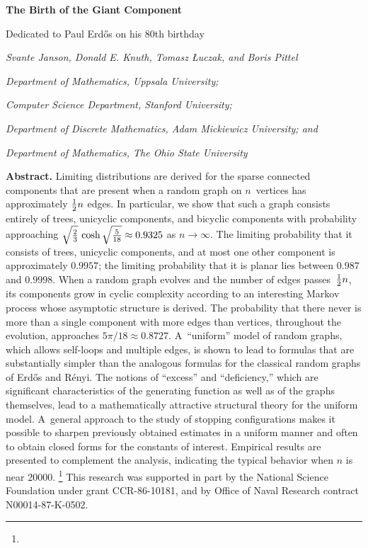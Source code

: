 \centerline{\bf The Birth of the Giant Component}
\bigskip
\centerline{Dedicated to Paul Erd\H{o}s on his 80th birthday}
\bigskip
\centerline{\sl Svante Janson, Donald E. Knuth, Tomasz \L uczak,
 and Boris Pittel}
\smallskip
\centerline{\sl Department of  Mathematics, Uppsala University;}
\centerline{\sl  Computer Science Department, Stanford University;}
\centerline{\sl Department of Discrete Mathematics, Adam Mickiewicz
University; and}
\centerline{\sl Department of Mathematics, The Ohio State University}
\bigskip
{\narrower\smallskip\noindent
{\bf Abstract.}\enspace
Limiting distributions are derived for the sparse connected components that are
present when a random graph on $n$~vertices has approximately ${1\over2}  n$
edges. In particular, we show that such a graph consists entirely of trees,
unicyclic components, and bicyclic components with probability approaching
$\sqrt{2\over 3}\,\cosh\sqrt{5\over 18}\approx0.9325$
 as $n\to\infty$. The limiting probability that it consists of trees, unicyclic
components, and at most one other component is approximately
$0.9957$; the limiting probability that it is planar lies between
$0.987$ and $0.9998$. When a random graph evolves and the number of edges 
passes~${1\over2} n$,
its components grow in cyclic complexity according to an interesting
Markov process
whose asymptotic structure is derived. The probability that there never is
more than a single component with more edges than vertices, throughout
the evolution,  approaches $5\pi/18\approx0.8727$.
A~``uniform'' model
of random graphs, which allows self-loops and multiple edges, is shown to lead
to formulas that are substantially simpler than the analogous formulas for
the classical random graphs of Erd{\H o}s and R\'enyi. 
The notions of ``excess''
and ``deficiency,'' which are significant characteristics of the generating
function as well as of the graphs themselves, lead to a mathematically
attractive structural theory for the uniform model. A~general
approach to the study of stopping configurations makes it possible to
sharpen previously obtained estimates in a uniform manner and often to
obtain closed forms for the constants of interest. Empirical results are
presented to complement the analysis, indicating the typical behavior when
$n$ is near 20000.
\footnote{}{\raise 11pt\null
This research 
was supported in part by the National Science Foundation under grant
CCR-86-10181,
and by Office of Naval Research contract
N00014-87-K-0502.}
\smallskip}

